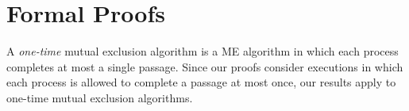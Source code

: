
\section{Formal Proofs}

A \emph{one-time} mutual exclusion algorithm is a ME algorithm in which each process completes at most a single passage. Since our proofs consider executions in which each process is allowed to complete a passage at most once, our results apply to one-time mutual exclusion algorithms.
